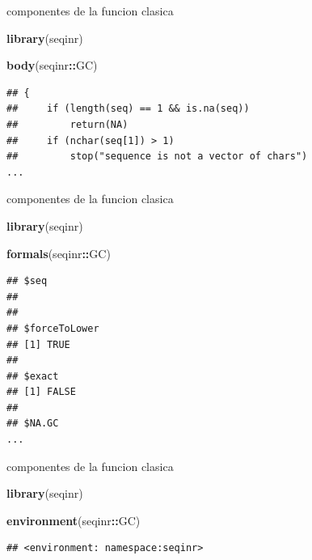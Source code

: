 \documentclass[ignorenonframetext,]{beamer}
\newenvironment{Shaded}{\begin{snugshade}}{\end{snugshade}}
\newcommand{\KeywordTok}[1]{\textcolor[rgb]{0.13,0.29,0.53}{\textbf{#1}}}
\newcommand{\NormalTok}[1]{#1}
\newcommand{\OperatorTok}[1]{\textcolor[rgb]{0.81,0.36,0.00}{\textbf{#1}}}
\begin{document}
\begin{frame}[fragile]{componentes de la funcion clasica}
\protect\hypertarget{componentes-de-la-funcion-clasica-1}{}

\begin{Shaded}
\begin{Highlighting}[]
\KeywordTok{library}\NormalTok{(seqinr)}

\KeywordTok{body}\NormalTok{(seqinr}\OperatorTok{::}\NormalTok{GC)}
\end{Highlighting}
\end{Shaded}

\begin{verbatim}
## {
##     if (length(seq) == 1 && is.na(seq)) 
##         return(NA)
##     if (nchar(seq[1]) > 1) 
##         stop("sequence is not a vector of chars")
...
\end{verbatim}

\end{frame}

\begin{frame}[fragile]{componentes de la funcion clasica}
\protect\hypertarget{componentes-de-la-funcion-clasica-2}{}

\begin{Shaded}
\begin{Highlighting}[]
\KeywordTok{library}\NormalTok{(seqinr)}

\KeywordTok{formals}\NormalTok{(seqinr}\OperatorTok{::}\NormalTok{GC)}
\end{Highlighting}
\end{Shaded}

\begin{verbatim}
## $seq
## 
## 
## $forceToLower
## [1] TRUE
## 
## $exact
## [1] FALSE
## 
## $NA.GC
...
\end{verbatim}

\end{frame}

\begin{frame}[fragile]{componentes de la funcion clasica}
\protect\hypertarget{componentes-de-la-funcion-clasica-3}{}

\begin{Shaded}
\begin{Highlighting}[]
\KeywordTok{library}\NormalTok{(seqinr)}

\KeywordTok{environment}\NormalTok{(seqinr}\OperatorTok{::}\NormalTok{GC)}
\end{Highlighting}
\end{Shaded}

\begin{verbatim}
## <environment: namespace:seqinr>
\end{verbatim}

\end{frame}
\end{document}
